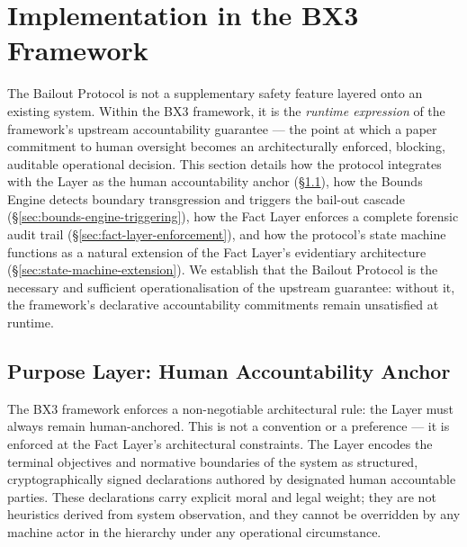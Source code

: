 
\section{Implementation in the BX3 Framework}
\label{sec:bailout-implementation}

The Bailout Protocol is not a supplementary safety feature layered onto an existing system. Within the BX3 framework, it is the \emph{runtime expression} of the framework's upstream accountability guarantee — the point at which a paper commitment to human oversight becomes an architecturally enforced, blocking, auditable operational decision. This section details how the protocol integrates with the \purpose{} Layer as the human accountability anchor (\S\ref{sec:purpose-layer-anchor}), how the Bounds Engine detects boundary transgression and triggers the bail-out cascade (\S\ref{sec:bounds-engine-triggering}), how the Fact Layer enforces a complete forensic audit trail (\S\ref{sec:fact-layer-enforcement}), and how the protocol's state machine functions as a natural extension of the Fact Layer's evidentiary architecture (\S\ref{sec:state-machine-extension}). We establish that the Bailout Protocol is the necessary and sufficient operationalisation of the upstream guarantee: without it, the framework's declarative accountability commitments remain unsatisfied at runtime.

\subsection{Purpose Layer: Human Accountability Anchor}
\label{sec:purpose-layer-anchor}

The BX3 framework enforces a non-negotiable architectural rule: the \purpose{} Layer must always remain human-anchored. This is not a convention or a preference — it is enforced at the Fact Layer's architectural constraints. The \purpose{} Layer encodes the terminal objectives and normative boundaries of the system as structured, cryptographically signed declarations authored by designated human accountable parties. These declarations carry explicit moral and legal weight; they are not heuristics derived from system observation, and they cannot be overridden by any machine actor in the hierarchy under any operational circumstance.

